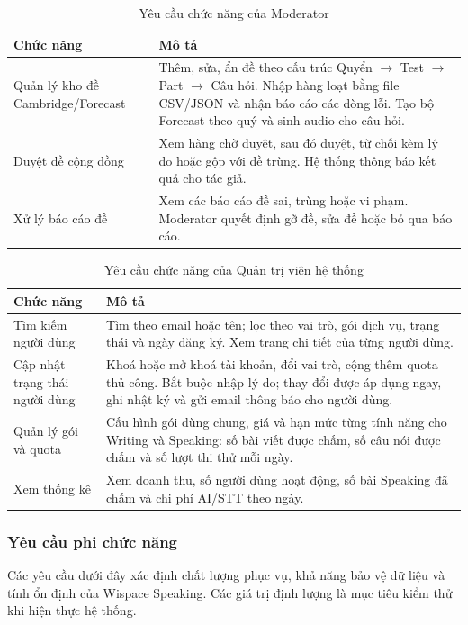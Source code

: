 \begin{table}[H]
\centering
\caption{Yêu cầu chức năng của Moderator}
\label{wispace:tab:func_moderator}
\small
\begin{tabular}{|p{4.2cm}|p{\dimexpr\linewidth-4.2cm-4\tabcolsep-3\arrayrulewidth\relax}|}
\hline
\textbf{Chức năng} & \textbf{Mô tả} \\
\hline
Quản lý kho đề Cambridge/Forecast & Thêm, sửa, ẩn đề theo cấu trúc Quyển $\rightarrow$ Test $\rightarrow$ Part $\rightarrow$ Câu hỏi. Nhập hàng loạt bằng file CSV/JSON và nhận báo cáo các dòng lỗi. Tạo bộ Forecast theo quý và sinh audio cho câu hỏi. \\
\hline
Duyệt đề cộng đồng & Xem hàng chờ duyệt, sau đó duyệt, từ chối kèm lý do hoặc gộp với đề trùng. Hệ thống thông báo kết quả cho tác giả. \\
\hline
Xử lý báo cáo đề & Xem các báo cáo đề sai, trùng hoặc vi phạm. Moderator quyết định gỡ đề, sửa đề hoặc bỏ qua báo cáo. \\
\hline
\end{tabular}
\end{table}

\begin{table}[H]
\centering
\caption{Yêu cầu chức năng của Quản trị viên hệ thống}
\label{wispace:tab:func_admin}
\small
\begin{tabular}{|p{4.2cm}|p{\dimexpr\linewidth-4.2cm-4\tabcolsep-3\arrayrulewidth\relax}|}
\hline
\textbf{Chức năng} & \textbf{Mô tả} \\
\hline
Tìm kiếm người dùng & Tìm theo email hoặc tên; lọc theo vai trò, gói dịch vụ, trạng thái và ngày đăng ký. Xem trang chi tiết của từng người dùng. \\
\hline
Cập nhật trạng thái người dùng & Khoá hoặc mở khoá tài khoản, đổi vai trò, cộng thêm quota thủ công. Bắt buộc nhập lý do; thay đổi được áp dụng ngay, ghi nhật ký và gửi email thông báo cho người dùng. \\
\hline
Quản lý gói và quota & Cấu hình gói dùng chung, giá và hạn mức từng tính năng cho Writing và Speaking: số bài viết được chấm, số câu nói được chấm và số lượt thi thử mỗi ngày. \\
\hline
Xem thống kê & Xem doanh thu, số người dùng hoạt động, số bài Speaking đã chấm và chi phí AI/STT theo ngày. \\
\hline
\end{tabular}
\end{table}
\newpage

\subsubsection{Yêu cầu phi chức năng}
Các yêu cầu dưới đây xác định chất lượng phục vụ, khả năng bảo vệ dữ liệu và tính ổn định của Wispace Speaking. Các giá trị định lượng là mục tiêu kiểm thử khi hiện thực hệ thống.

